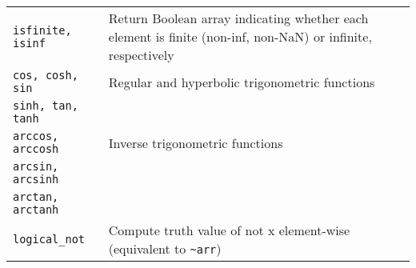 \begin{table}
\begin{tabularx}{\textwidth}{lX}
        \verb|isfinite, isinf| & Return Boolean array indicating whether each element is finite (non-inf, non-NaN) or infinite, respectively \\
        \verb|cos, cosh, sin|  & Regular and hyperbolic trigonometric functions                                                              \\
        \verb|sinh, tan, tanh| &                                                                                                             \\
        \verb|arccos, arccosh| & Inverse trigonometric functions                                                                             \\
        \verb|arcsin, arcsinh| &                                                                                                             \\
        \verb|arctan, arctanh| &                                                                                                             \\
        \verb|logical_not|     & Compute truth value of not x element-wise (equivalent to \verb|~arr|)                                       \\
        \hline
    \end{tabularx}
\end{table}


